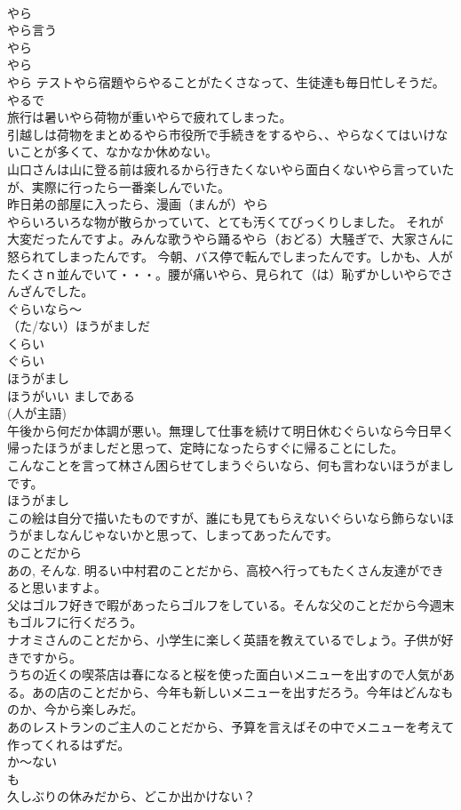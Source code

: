 \documentclass[8pt]{extreport}
\begin{document}
\begin{CJK}{UTF8}{min}
\\	やら
\\	やら言う 
\\	やら 
\\	やら
\\	やら テストやら宿題やらやることがたくさなって、生徒達も毎日忙しそうだ。 
\\	やるで 
\\	旅行は暑いやら荷物が重いやらで疲れてしまった。 
\\	引越しは荷物をまとめるやら市役所で手続きをするやら、、やらなくてはいけないことが多くて、なかなか休めない。 
\\	山口さんは山に登る前は疲れるから行きたくないやら面白くないやら言っていたが、実際に行ったら一番楽しんでいた。 
\\	昨日弟の部屋に入ったら、漫画（まんが）やら
\\	やらいろいろな物が散らかっていて、とても汚くてびっくりしました。 それが大変だったんですよ。みんな歌うやら踊るやら（おどる）大騒ぎで、大家さんに怒られてしまったんです。 今朝、バス停で転んでしまったんです。しかも、人がたくさｎ並んでいて・・・。腰が痛いやら、見られて（は）恥ずかしいやらでさんざんでした。
\\	ぐらいなら～
\\	（た/ない）ほうがましだ	
\\	くらい 
\\	ぐらい 
\\	ほうがまし 
\\	ほうがいい ましである 
\\	(人が主語) 
\\	午後から何だか体調が悪い。無理して仕事を続けて明日休むぐらいなら今日早く帰ったほうがましだと思って、定時になったらすぐに帰ることにした。 
\\	こんなことを言って林さん困らせてしまうぐらいなら、何も言わないほうがましです。 
\\	ほうがまし 
\\	この絵は自分で描いたものですが、誰にも見てもらえないぐらいなら飾らないほうがましなんじゃないかと思って、しまってあったんです。 
\\	のことだから	
\\	あの, そんな. 明るい中村君のことだから、高校へ行ってもたくさん友達ができると思いますよ。 
\\	父はゴルフ好きで暇があったらゴルフをしている。そんな父のことだから今週末もゴルフに行くだろう。 
\\	ナオミさんのことだから、小学生に楽しく英語を教えているでしょう。子供が好きですから。 
\\	うちの近くの喫茶店は春になると桜を使った面白いメニューを出すので人気がある。あの店のことだから、今年も新しいメニューを出すだろう。今年はどんなものか、今から楽しみだ。 
\\	あのレストランのご主人のことだから、予算を言えばその中でメニューを考えて作ってくれるはずだ。 
\\	か～ない	
\\	も 
\\	久しぶりの休みだから、どこか出かけない？
\end{CJK}
\end{document}
